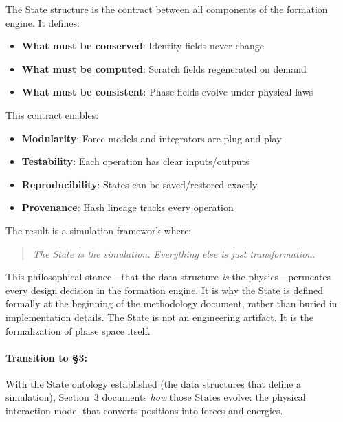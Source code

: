 \documentclass[11pt]{article}
\begin{document}
The State structure is the contract between all components of the formation engine. It defines:

\begin{itemize}
\item \textbf{What must be conserved}: Identity fields never change
\item \textbf{What must be computed}: Scratch fields regenerated on demand
\item \textbf{What must be consistent}: Phase fields evolve under physical laws
\end{itemize}

This contract enables:

\begin{itemize}
\item \textbf{Modularity}: Force models and integrators are plug-and-play
\item \textbf{Testability}: Each operation has clear inputs/outputs
\item \textbf{Reproducibility}: States can be saved/restored exactly
\item \textbf{Provenance}: Hash lineage tracks every operation
\end{itemize}

The result is a simulation framework where:

\begin{quote}
\textit{The State is the simulation. Everything else is just transformation.}
\end{quote}

This philosophical stance---that the data structure \textit{is} the physics---permeates every design decision in the formation engine. It is why the State is defined formally at the beginning of the methodology document, rather than buried in implementation details. The State is not an engineering artifact. It is the formalization of phase space itself.

\paragraph{Transition to \S3:} With the State ontology established (the data structures that define a simulation), Section~3 documents \textit{how} those States evolve: the physical interaction model that converts positions into forces and energies.
\end{document}
